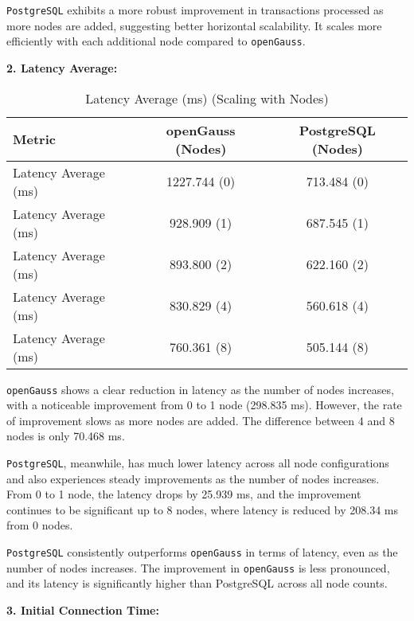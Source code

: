 \documentclass[12pt,a4paper,cs4size]{ctexart}
\begin{document}
\texttt{PostgreSQL} exhibits a more robust improvement in transactions processed as more nodes are added, suggesting better horizontal scalability. It scales more efficiently with each additional node compared to \texttt{openGauss}.


\textbf{2. Latency Average:}

\begin{table}[h!]
\centering
\captionsetup{labelformat=empty}
\begin{tabular}{|l|c|c|}
\hline
\textbf{Metric} & \textbf{openGauss (Nodes)} & \textbf{PostgreSQL (Nodes)} \\
\hline
Latency Average (ms) & 1227.744 (0) & 713.484 (0) \\
\hline
Latency Average (ms) & 928.909 (1) & 687.545 (1) \\
\hline
Latency Average (ms) & 893.800 (2) & 622.160 (2) \\
\hline
Latency Average (ms) & 830.829 (4) & 560.618 (4) \\
\hline
Latency Average (ms) & 760.361 (8) & 505.144 (8) \\
\hline
\end{tabular}
\caption{Latency Average (ms) (Scaling with Nodes)}
\end{table}


\texttt{openGauss} shows a clear reduction in latency as the number of nodes increases, with a noticeable improvement from 0 to 1 node (298.835 ms). However, the rate of improvement slows as more nodes are added. The difference between 4 and 8 nodes is only 70.468 ms.

\texttt{PostgreSQL}, meanwhile, has much lower latency across all node configurations and also experiences steady improvements as the number of nodes increases. From 0 to 1 node, the latency drops by 25.939 ms, and the improvement continues to be significant up to 8 nodes, where latency is reduced by 208.34 ms from 0 nodes.

\texttt{PostgreSQL} consistently outperforms \texttt{openGauss} in terms of latency, even as the number of nodes increases. The improvement in \texttt{openGauss} is less pronounced, and its latency is significantly higher than PostgreSQL across all node counts.

\textbf{3. Initial Connection Time:}
\end{document}

